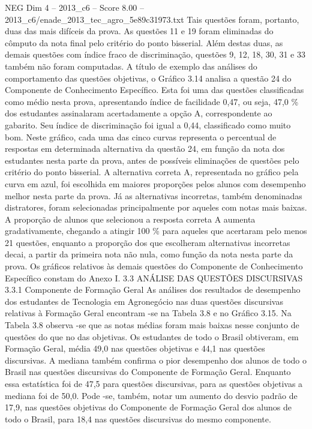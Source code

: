 \begin{textsample}{NEG Dim 4 – 2013\_c6 – Score 8.00 – 2013\_c6/enade\_2013\_tec\_agro\_5e89c31973.txt}
Tais questões foram, portanto, duas das mais difíceis da prova.
As questões 11 e 19 foram eliminadas do cômputo da nota final pelo critério do ponto bisserial.
Além destas duas, as demais questões com índice fraco de discriminação, questões 9, 12, 18, 30, 31 e 33 também não foram computadas.
A título de exemplo das análises do comportamento das questões objetivas, o Gráfico 3.14 analisa a questão 24 do Componente de Conhecimento Específico.
Esta foi uma das questões classificadas como médio nesta prova, apresentando índice de facilidade 0,47, ou seja, 47,0 \% dos estudantes assinalaram acertadamente a opção A, correspondente ao gabarito.
Seu índice de discriminação foi igual a 0,44, classificado como muito bom.
Neste gráfico, cada uma das cinco curvas representa o percentual de respostas em determinada alternativa da questão 24, em função da nota dos estudantes nesta parte da prova, antes de possíveis eliminações de questões pelo critério do ponto bisserial.
A alternativa correta A, representada no gráfico pela curva em azul, foi escolhida em maiores proporções pelos alunos com desempenho melhor nesta parte da prova.
Já as alternativas incorretas, também denominadas distratores, foram selecionadas principalmente por aqueles com notas mais baixas.
A proporção de alunos que selecionou a resposta correta A aumenta gradativamente, chegando a atingir 100 \% para aqueles que acertaram pelo menos 21 questões, enquanto a proporção dos que escolheram alternativas incorretas decai, a partir da primeira nota não nula, como função da nota nesta parte da prova.
Os gráficos relativos às demais questões do Componente de Conhecimento Específico constam do Anexo I. 3.3 ANÁLISE DAS QUESTÕES DISCURSIVAS 3.3.1 Componente de Formação Geral As análises dos resultados de desempenho dos estudantes de Tecnologia em Agronegócio nas duas questões discursivas relativas à Formação Geral encontram -se na Tabela 3.8 e no Gráfico 3.15.
Na Tabela 3.8 observa -se que as notas médias foram mais baixas nesse conjunto de questões do que no das objetivas.
Os estudantes de todo o Brasil obtiveram, em Formação Geral, média 49,0 nas questões objetivas e 44,1 nas questões discursivas.
A mediana também confirma o pior desempenho dos alunos de todo o Brasil nas questões discursivas do Componente de Formação Geral.
Enquanto essa estatística foi de 47,5 para questões discursivas, para as questões objetivas a mediana foi de 50,0.
Pode -se, também, notar um aumento do desvio padrão de 17,9, nas questões objetivas do Componente de Formação Geral dos alunos de todo o Brasil, para 18,4 nas questões discursivas do mesmo componente.

\end{textsample}
